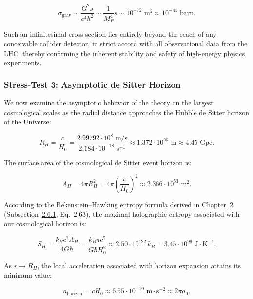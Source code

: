 \begin{equation}\label{eq:5.62}\tag{5.62}
\sigma_{\text{grav}} \sim \frac{G^2 s}{c^4 \hbar^2} \sim \frac{1}{M_P^4} s \sim 10^{-72}\text{ m}^2 \approx 10^{-44}\text{ barn}.
\end{equation}

Such an infinitesimal cross section lies entirely beyond the reach of any conceivable collider detector, in strict accord with all observational data from the LHC, thereby confirming the inherent stability and safety of high-energy physics experiments.

\subsubsection{Stress-Test 3: Asymptotic de Sitter Horizon}\label{sec:5.4.3}

We now examine the asymptotic behavior of the theory on the largest cosmological scales as the radial distance approaches the Hubble de Sitter horizon of the Universe:

\begin{equation}\label{eq:5.63}\tag{5.63}
R_H = \frac{c}{H_0} = \frac{2.99792 \cdot 10^8\text{ m/s}}{2.184 \cdot 10^{-18}\text{ s}^{-1}} \approx 1.372 \cdot 10^{26}\text{ m} \approx 4.45\text{ Gpc}.
\end{equation}

The surface area of the cosmological de Sitter event horizon is:

\begin{equation}\label{eq:5.64}\tag{5.64}
A_H = 4\pi R_H^2 = 4\pi \left( \frac{c}{H_0} \right)^2 \approx 2.366 \cdot 10^{53}\text{ m}^2.
\end{equation}

According to the Bekenstein--Hawking entropy formula derived in Chapter~\hyperref[sec:rozdil2]{2} (Subsection~\hyperref[sec:2.6.1]{2.6.1}, Eq.~2.63), the maximal holographic entropy associated with our cosmological horizon is:

\begin{equation}\label{eq:5.65}\tag{5.65}
S_H = \frac{k_B c^3 A_H}{4 G \hbar} = \frac{k_B \pi c^5}{G \hbar H_0^2} \approx 2.50 \cdot 10^{122}\,k_B = 3.45 \cdot 10^{99}\text{ J}\cdot\text{K}^{-1}.
\end{equation}

As $r \to R_H$, the local acceleration associated with horizon expansion attains its minimum value:

\begin{equation}\label{eq:5.66}\tag{5.66}
a_{\text{horizon}} = c H_0 \approx 6.55 \cdot 10^{-10}\text{ m}\cdot\text{s}^{-2} \approx 2\pi a_0.
\end{equation}

